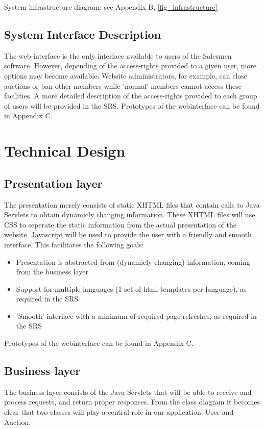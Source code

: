 \documentclass[salesmen, twoside]{../../../templates/latex/2009/softproj}
\begin{document}
\begin{projdoc}
System infrastructure diagram: see Appendix B, \ref{fig_infrastructure}


\section{System Interface Description}
The web-interface is the only interface available to users of the Salesmen software. However, depending of the access-rights provided to a given user, more options may become available. Website administrators, for example, can close auctions or ban other members while 'normal' members cannot access these facilities. A more detailed description of the access-rights provided to each group of users will be provided in the SRS.
Prototypes of the webinterface can be found in Appendix C.
\chapter{Technical Design \label{Technical Design}}
\section{Presentation layer}
The presentation merely consists of static XHTML files that contain calls to Java Servlets to obtain dynamicly changing information. These XHTML files will use CSS to seperate the static information from the actual presentation of the website. Javascript will be used to provide the user with a friendly and smooth interface.
This facilitates the following goals:
\begin{itemize}
\item Presentation is abstracted from (dynamicly changing) information, coming from the business layer
\item Support for multiple languages (1 set of html templates per language), as required in the SRS
\item 'Smooth' interface with a minimum of required page refreshes, as required in the SRS
\end{itemize}
Prototypes of the webinterface can be found in Appendix C.

\section{Business layer}
The business layer consists of the Java Servlets that will be able to receive and process requests, and return proper responses.
From the class diagram it becomes clear that two classes will play a central role in our application: User and Auction.


\end{projdoc}
\end{document}
